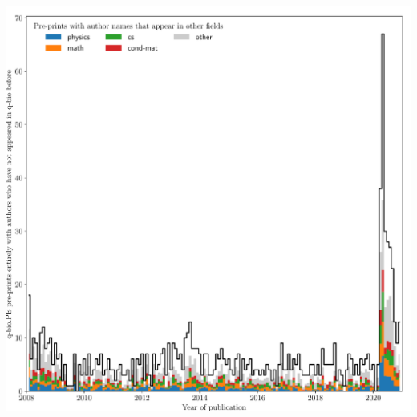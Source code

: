 \documentclass{nature}
\makeatletter
\renewenvironment*{figure}{\@float{figure}}{\end@float}
\makeatother
\begin{document}
  \begin{figure}
     \includegraphics[width=\textwidth]{q-bio-pre-prints-with-author-overlap}
     \caption{Many physicists and mathematicians posted pre-prints to quantitative biology in 2020 for the first time. Pre-prints in \emph{Populations and Evolution} (q-bio.PE) that are written entirely by authors who have never before appeared in quantitative biology (q-bio). The area shows the number of pre-prints where those authors have appeared in other fields.
     }
   	\label{fig:q-bio-pre-prints-with-author-overlap}
	\end{figure}	





 
\end{document}
